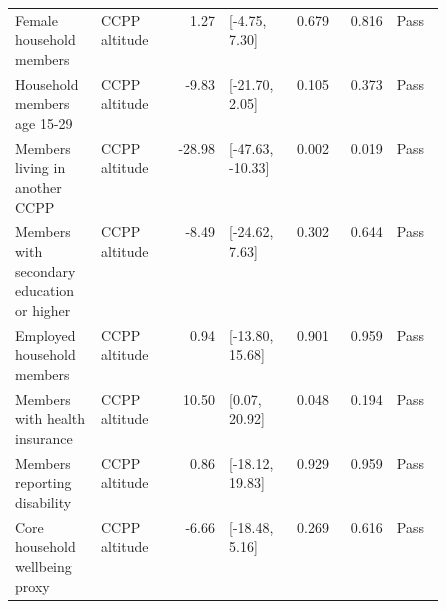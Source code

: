 \begin{longtable}{@{}p{0.20\linewidth}p{0.16\linewidth}rp{0.14\linewidth}rrl@{}}
Female household members & CCPP altitude & 1.27 & [-4.75, 7.30] & 0.679 & 0.816 & Pass \\
Household members age 15-29 & CCPP altitude & -9.83 & [-21.70, 2.05] & 0.105 & 0.373 & Pass \\
Members living in another CCPP & CCPP altitude & -28.98 & [-47.63, -10.33] & 0.002 & 0.019 & Pass \\
Members with secondary education or higher & CCPP altitude & -8.49 & [-24.62, 7.63] & 0.302 & 0.644 & Pass \\
Employed household members & CCPP altitude & 0.94 & [-13.80, 15.68] & 0.901 & 0.959 & Pass \\
Members with health insurance & CCPP altitude & 10.50 & [0.07, 20.92] & 0.048 & 0.194 & Pass \\
Members reporting disability & CCPP altitude & 0.86 & [-18.12, 19.83] & 0.929 & 0.959 & Pass \\
Core household wellbeing proxy & CCPP altitude & -6.66 & [-18.48, 5.16] & 0.269 & 0.616 & Pass \\
\end{longtable}
\endgroup
